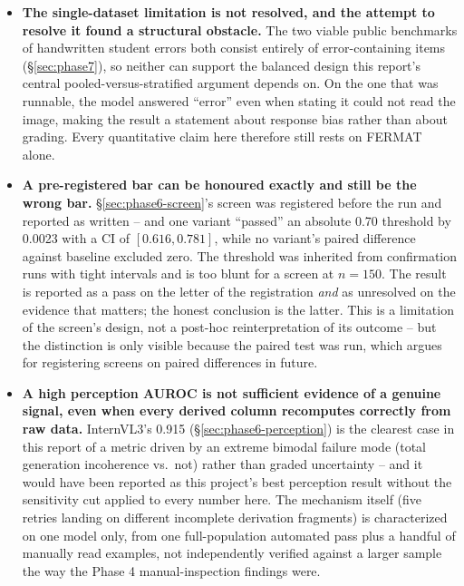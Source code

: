 \documentclass[11pt]{article}
\begin{document}
\begin{itemize}
    perception entropy; it is not a general theory of when a VLM will or
    will not clear the gate.
  \item \textbf{The single-dataset limitation is not resolved, and the
    attempt to resolve it found a structural obstacle.} The two viable
    public benchmarks of handwritten student errors both consist entirely
    of error-containing items (\S\ref{sec:phase7}), so neither can support
    the balanced design this report's central pooled-versus-stratified
    argument depends on. On the one that was runnable, the model answered
    ``error'' even when stating it could not read the image, making the
    result a statement about response bias rather than about grading.
    Every quantitative claim here therefore still rests on FERMAT alone.
  \item \textbf{A pre-registered bar can be honoured exactly and still be
    the wrong bar.} \S\ref{sec:phase6-screen}'s screen was registered
    before the run and reported as written -- and one variant ``passed''
    an absolute 0.70 threshold by 0.0023 with a CI of $[0.616, 0.781]$,
    while no variant's paired difference against baseline excluded zero.
    The threshold was inherited from confirmation runs with tight
    intervals and is too blunt for a screen at $n=150$. The result is
    reported as a pass on the letter of the registration \emph{and} as
    unresolved on the evidence that matters; the honest conclusion is the
    latter. This is a limitation of the screen's design, not a
    post-hoc reinterpretation of its outcome -- but the distinction is
    only visible because the paired test was run, which argues for
    registering screens on paired differences in future.
  \item \textbf{A high perception AUROC is not sufficient evidence of a
    genuine signal, even when every derived column recomputes correctly
    from raw data.} InternVL3's 0.915 (\S\ref{sec:phase6-perception}) is
    the clearest case in this report of a metric driven by an extreme
    bimodal failure mode (total generation incoherence vs.\ not) rather
    than graded uncertainty -- and it would have been reported as this
    project's best perception result without the sensitivity cut applied
    to every number here. The mechanism itself (five retries landing on
    different incomplete derivation fragments) is characterized on one
    model only, from one full-population automated pass plus a handful of
    manually read examples, not independently verified against a larger
    sample the way the Phase 4 manual-inspection findings were.

\end{itemize}
\end{document}
